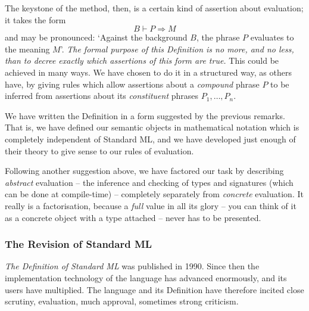 The keystone of the method, then, is a certain kind of assertion about
evaluation; it takes the form
\[ B\vdash P\Rightarrow M\]
and may be pronounced: `Against the background $B$, the phrase $P$ evaluates
to the meaning $M$'.  {\sl The formal purpose of this Definition is no more,
and no less, than to decree exactly which assertions of this form are true.}
This could be achieved in many ways. We have chosen to do it in a structured
way, as others have, by giving rules which allow assertions about a
{\sl compound} phrase $P$ to be inferred from assertions about its
{\sl constituent} phrases $P_1,\ldots,P_n$.

We have written the Definition in a form suggested by the previous remarks.
That is, we have defined our semantic objects in mathematical
notation which is completely independent of Standard ML, and we have
developed just enough of their theory to give sense to our rules of
evaluation.

   Following another suggestion above, we have factored our task
by describing {\sl abstract} evaluation -- the inference and checking of
types and signatures (which can be done at compile-time) -- completely
separately from {\sl concrete} evaluation.
It really is a factorisation, because a {\sl full} value in all its glory --
you can think of it as a concrete object with a type
attached -- never has to be presented.


\subsubsection*{The Revision of Standard ML}
{\it The Definition of Standard ML} was published in 1990.
Since then the implementation technology of
the language has advanced enormously, and its users have
multiplied.  The language and its Definition
have therefore incited close scrutiny, evaluation, much approval,
sometimes strong criticism.

